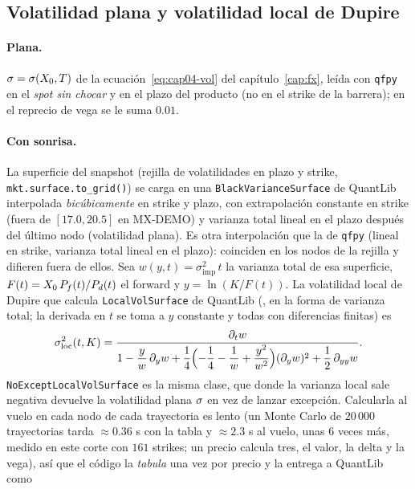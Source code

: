 \subsection{Volatilidad plana y volatilidad local de Dupire}\label{sec:cap15-vol}

\paragraph{Plana.} $\sigma=\sigma(X_0,T)$ de la ecuación~\eqref{eq:cap04-vol} del capítulo~\ref{cap:fx}, leída con \texttt{qfpy} en el
\emph{spot sin chocar} y en el plazo del producto (no en el strike de la barrera); en el reprecio de vega se le suma $0.01$.

\paragraph{Con sonrisa.} La superficie del snapshot (rejilla de volatilidades en plazo y strike, \texttt{mkt.surface.to\_grid()}) se
carga en una \texttt{BlackVarianceSurface} de QuantLib interpolada \emph{bicúbicamente} en strike y plazo, con extrapolación
constante en strike (fuera de $[17.0,20.5]$ en MX-DEMO) y varianza total lineal en el plazo después del último nodo (volatilidad
plana). Es otra interpolación que la de \texttt{qfpy} (lineal en strike, varianza total lineal en el plazo): coinciden en los nodos
de la rejilla y difieren fuera de ellos. Sea $w(y,t)=\sigma_{\mathrm{imp}}^2\,t$ la varianza total de esa superficie, $F(t)=X_0\,P_{f}(t)/P_{d}(t)$
el forward y $y=\ln(K/F(t))$. La volatilidad local de Dupire que calcula \texttt{LocalVolSurface} de QuantLib
(\citealt{gatheral2006}, en la forma de varianza total; la derivada en $t$ se toma a $y$ constante y todas con diferencias finitas) es
\begin{equation}\label{eq:cap15-dupire}
  \sigma_{\mathrm{loc}}^2(t,K)=\frac{\partial_t w}{1-\dfrac{y}{w}\,\partial_y w+\dfrac14\Bigl(-\dfrac14-\dfrac1w+\dfrac{y^2}{w^2}\Bigr)(\partial_y w)^2+\dfrac12\,\partial_{yy}w}.
\end{equation}
\texttt{NoExceptLocalVolSurface} es la misma clase, que donde la varianza local sale negativa devuelve la volatilidad plana $\sigma$ en vez
de lanzar excepción. Calcularla al vuelo en cada nodo de cada trayectoria es lento (un Monte Carlo de $20\,000$ trayectorias tarda $\approx0.36$ s con la tabla y $\approx2.3$ s al vuelo,
unas $6$ veces más, medido en este corte con $161$ strikes; un precio calcula tres, el valor, la delta y la vega), así que el código la \emph{tabula} una vez por precio y la entrega a QuantLib como
